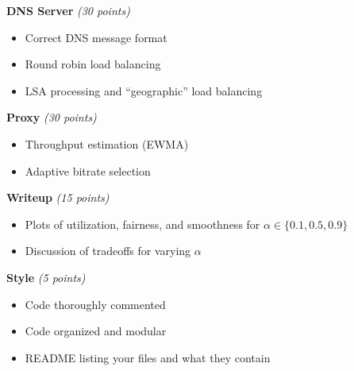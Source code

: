 \documentclass{article}
\begin{document}
\smallskip \noindent \textbf{DNS Server} \textit{(30 points)}
\begin{itemize}
	\item Correct DNS message format
	\item Round robin load balancing
	\item LSA processing and ``geographic'' load balancing
\end{itemize}

\smallskip \noindent \textbf{Proxy} \textit{(30 points)}
\begin{itemize}
	\item Throughput estimation (EWMA)
	\item Adaptive bitrate selection
\end{itemize}

\smallskip \noindent \textbf{Writeup} \textit{(15 points)}
\begin{itemize}
	\item Plots of utilization, fairness, and smoothness for $\alpha \in \{0.1, 0.5, 0.9\}$
	\item Discussion of tradeoffs for varying $\alpha$
\end{itemize}

\smallskip \noindent \textbf{Style} \textit{(5 points)}
\begin{itemize}
	\item Code thoroughly commented
	\item Code organized and modular
	\item README listing your files and what they contain
\end{itemize}
\end{document}
